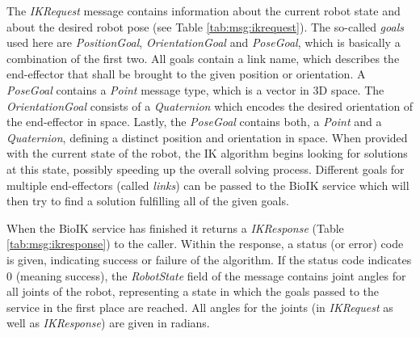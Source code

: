The \textit{IKRequest} message contains information about the current robot state and about the desired robot pose (see Table \ref{tab:msg:ikrequest}). The so-called \textit{goals} used here are \textit{PositionGoal}, \textit{OrientationGoal} and \textit{PoseGoal}, which is basically a combination of the first two. All goals contain a link name, which describes the end-effector that shall be brought to the given position or orientation. A \textit{PoseGoal} contains a \textit{Point} message type, which is a vector in 3D space. The \textit{OrientationGoal} consists of a \textit{Quaternion} which encodes the desired orientation of the end-effector in space. Lastly, the \textit{PoseGoal} contains both, a \textit{Point} and a \textit{Quaternion}, defining a distinct position and orientation in space. When provided with the current state of the robot, the IK algorithm begins looking for solutions at this state, possibly speeding up the overall solving process. Different goals for multiple end-effectors (called \textit{links}) can be passed to the BioIK service which will then try to find a solution fulfilling all of the given goals.

When the BioIK service has finished it returns a \textit{IKResponse} (Table \ref{tab:msg:ikresponse}) to the caller. Within the response, a status (or error) code is given, indicating success or failure of the algorithm. If the status code indicates 0 (meaning success), the \textit{RobotState} field of the message contains joint angles for all joints of the robot, representing a state in which the goals passed to the service in the first place are reached. All angles for the joints (in \textit{IKRequest} as well as \textit{IKResponse}) are given in radians.

